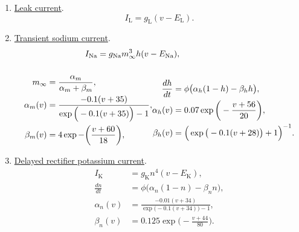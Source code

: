 \documentclass[../main.tex]{subfiles}
\begin{document}
\begin{enumerate}
    \item \underline{Leak current}. 
        \begin{equation}
            I_{\text{L}} = g_{\text{L}}(v-E_{\text{L}}).
            \label{eq:basket-leak-current}
        \end{equation}
    \item \underline{Transient sodium current}. 
        \begin{equation}
        \begin{aligned}
            &\hspace{-2.8cm}I_{\text{Na}} = g_{\text{Na}}m_{\infty}^3h(v-E_{\text{Na}}),  \\
            & \\
        \begin{aligned}
            m_\infty &= \displaystyle\frac{\alpha_m}{\alpha_m+\beta_m}, \\
            \alpha_m(v) &= \displaystyle\frac{-0.1(v+35)}{\exp{\Big(-0.1(v+35)\Big)}-1},\\ %
            \beta_m(v) &= 4\exp{-\bigg(\displaystyle\frac{v+60}{18} \bigg)}, \\
        \end{aligned}
        &
        \begin{aligned}
            \displaystyle\frac{dh}{dt} &= \phi\big(\alpha_h(1-h)-\beta_hh\big),\\
            \alpha_h(v) &= 0.07\exp{\bigg(-\displaystyle\frac{v+56}{20} \bigg)},\\ %
            \beta_h(v) &= \Big(\exp{\big(-0.1(v+28)\big)}+1\Big)^{-1}.
        \end{aligned}
        \end{aligned}
        \label{eq:basket-sodium-current}
        \end{equation}
    \item \underline{Delayed rectifier potassium current}.
        \begin{equation}
        \begin{aligned}
            I_{\text{K}} &= g_{\text{K}}n^4(v-E_{\text{K}}), \\
            \displaystyle\frac{dn}{dt} &= \phi\big(\alpha_n(1-n)-\beta_nn\big),\\
            \alpha_n(v) &= \displaystyle\frac{-0.01(v+34)}{\exp{\big(-0.1(v+34)\big)}-1},\\%
            \beta_n(v) &= 0.125\exp{\bigg(-\displaystyle\frac{v+44}{80} \bigg)}.
            \label{eq:basket-potassium-current}
        \end{aligned}
        \end{equation}
\end{enumerate}
\end{document}
